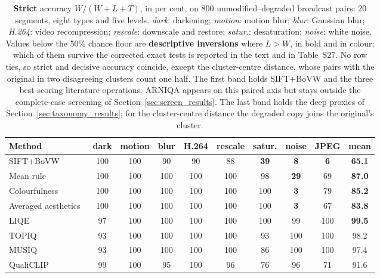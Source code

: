 \begin{table}[!ht]
\centering
\caption{\textbf{Strict} accuracy $W/(W+L+T)$, in per cent, on 800 unmodified--degraded broadcast pairs: 20
segments, eight types and five levels. \emph{dark}: darkening; \emph{motion}: motion
blur; \emph{blur}: Gaussian blur; \emph{H.264}: video recompression; \emph{rescale}:
downscale and restore; \emph{satur.}: desaturation; \emph{noise}: white noise. Values below the 50\% chance
floor are \textbf{descriptive inversions} where $L>W$, in bold and in colour;
which of them survive the corrected exact tests is reported in the text and in Table~S27.
No row ties, so strict and decisive accuracy coincide, except the cluster-centre distance, whose \taxCentMeios{} pairs with the original in two disagreeing clusters count one half. The first band holds SIFT+BoVW and the three best-scoring literature operations. ARNIQA appears on this paired axis but stays outside the
complete-case screening of Section~\ref{sec:screen_results}. The last band holds the deep proxies of Section~\ref{sec:taxonomy_results}; for the cluster-centre distance the degraded copy joins the original's cluster.}
\label{tab:constructed}
\scriptsize
\setlength{\tabcolsep}{1.9pt}
\begin{tabular}{@{}lccccccccc@{}}
\toprule
\textbf{Method} & \textbf{dark} & \textbf{motion} & \textbf{blur} & \textbf{H.264}
& \textbf{rescale} & \textbf{satur.} & \textbf{noise} & \textbf{JPEG} & \textbf{mean} \\
\midrule
SIFT+BoVW & 100 & 100 & 90 & 90 & 88 &
\textcolor{accentred}{\textbf{39}} & \textcolor{accentred}{\textbf{8}} &
\textcolor{accentred}{\textbf{6}} & \textbf{65.1} \\
Mean rule~\citep{srinivas2016rank} & 100 & 100 & 100 & 100 & 100 & 98 & \textcolor{accentred}{\textbf{29}} & 69 & \textbf{87.0} \\
Colourfulness~\citep{hasler2003colorfulness} & 100 & 100 & 100 & 100 & 100 & 100 & \textcolor{accentred}{\textbf{3}} & 79 & \textbf{85.2} \\
Averaged aesthetics~\citep{gygli2014summe} & 100 & 100 & 100 & 100 & 100 & 100 & \textcolor{accentred}{\textbf{3}} & 67 & \textbf{83.8} \\
\midrule
LIQE & 97 & 100 & 100 & 100 & 100 & 100 & 99 & 100 & \textbf{99.5} \\
TOPIQ & 93 & 100 & 100 & 100 & 100 & 93 & 100 & 100 & 98.2 \\
MUSIQ & 93 & 100 & 100 & 100 & 100 & 86 & 100 & 100 & 97.4 \\
QualiCLIP & 99 & 100 & 95 & 100 & 96 & 76 & 96 & 71 & 91.6 \\

\end{tabular}
\end{table}

